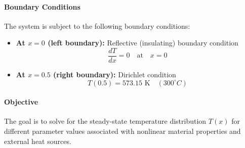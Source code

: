 \documentclass{article}
\begin{document}
	\paragraph{Boundary Conditions}
	The system is subject to the following boundary conditions:
	\begin{itemize}
		\item \textbf{At \( x = 0 \) (left boundary):} Reflective (insulating) boundary condition
		\begin{equation}
			\frac{dT}{dx} = 0 \quad \text{at} \quad x = 0
		\end{equation}
		\item \textbf{At \( x = 0.5 \) (right boundary):} Dirichlet condition
		\begin{equation}
			T(0.5) = 573.15 \text{ K} \quad (300^\circ C)
		\end{equation}
	\end{itemize}
	
	\paragraph{Objective}
	The goal is to solve for the steady-state temperature distribution \( T(x) \) for different parameter values associated with nonlinear material properties and external heat sources.
	
\end{document}
